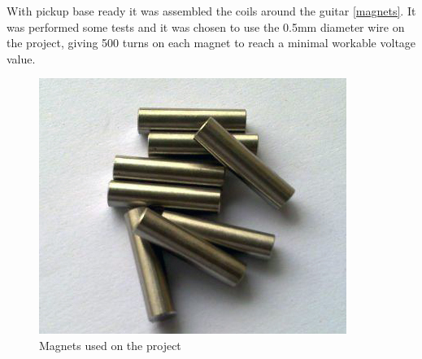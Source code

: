 With pickup base ready it was assembled the coils around the guitar \autoref{magnets}.
It was performed some tests and it was chosen to use the 0.5mm diameter wire on the project,
giving 500 turns on each magnet to reach a minimal workable voltage value.

\begin{figure}[!htpb]
\centering
\caption{Magnets used on the project}
\label{magnets}
\includegraphics[scale=0.2]{images/magnets}
\end{figure}
